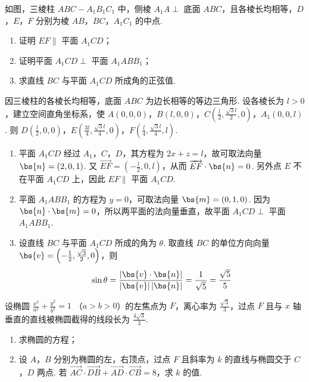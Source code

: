 \begin{problem}
如图，三棱柱 \(ABC - A_{1}B_{1}C_{1}\) 中，侧棱 \(A_{1}A \perp\) 底面 \(ABC\)，且各棱长均相等，\(D\)，\(E\)，\(F\) 分别为棱 \(AB\)，\(BC\)，\(A_{1}C_{1}\) 的中点.
\begin{enumerate}
\item 证明 \(EF \parallel\) 平面 \(A_{1}CD\)；
\item 证明平面 \(A_{1}CD \perp\) 平面 \(A_{1}ABB_{1}\)；
\item 求直线 \(BC\) 与平面 \(A_{1}CD\) 所成角的正弦值.
\end{enumerate}

\end{problem}

\begin{solution}
因三棱柱的各棱长均相等，底面 \(ABC\) 为边长相等的等边三角形. 设各棱长为 \(l>0\)，建立空间直角坐标系，使
\(A(0,0,0)\)，\(B(l,0,0)\)，\(C\left(\frac l2,\frac{\sqrt{3}l}{2},0\right)\)，\(A_1(0,0,l)\).
则
\(D\left(\frac l2,0,0\right)\)，\(E\left(\frac{3l}{4},\frac{\sqrt{3}l}{4},0\right)\)，\(F\left(\frac l4,\frac{\sqrt{3}l}{4},l\right)\).

\begin{enumerate}
\item 平面 \(A_1CD\) 经过 \(A_1\)，\(C\)，\(D\)，其方程为 \(2x+z=l\)，故可取法向量 \(\bs{n}=(2,0,1)\). 又
\(\overrightarrow{EF}=\left(-\frac l2,0,l\right)\)，从而 \(\overrightarrow{EF}\cdot\bs{n}=0\). 另外点 \(E\) 不在平面 \(A_1CD\) 上，因此 \(EF\parallel\) 平面 \(A_1CD\).

\item 平面 \(A_1ABB_1\) 的方程为 \(y=0\)，可取法向量 \(\bs{m}=(0,1,0)\). 因为 \(\bs{n}\cdot\bs{m}=0\)，所以两平面的法向量垂直，故平面 \(A_1CD\perp\) 平面 \(A_1ABB_1\).

\item 设直线 \(BC\) 与平面 \(A_1CD\) 所成的角为 \(\theta\). 取直线 \(BC\) 的单位方向向量
\(\bs{v}=\left(-\frac12,\frac{\sqrt{3}}{2},0\right)\)，则
\[
\sin\theta=\frac{|\bs{v}\cdot\bs{n}|}{|\bs{v}|\,|\bs{n}|}
=\frac{1}{\sqrt{5}}=\frac{\sqrt{5}}{5}
\]
\end{enumerate}
\end{solution}

\begin{problem}
设椭圆 \(\frac{x^2}{a^2} + \frac{y^2}{b^2} = 1 \) （\(a > b > 0\)）的左焦点为 \(F\)，离心率为 \(\frac{\sqrt{3}}{3}\)，过点 \(F\) 且与 \(x\) 轴垂直的直线被椭圆截得的线段长为 \(\frac{4\sqrt{3}}{3}\).
\begin{enumerate}
\item 求椭圆的方程；
\item 设 \(A\)，\(B\) 分别为椭圆的左，右顶点，过点 \(F\) 且斜率为 \(k\) 的直线与椭圆交于 \(C\)，\(D\) 两点. 若 \(\overrightarrow{AC} \cdot \overrightarrow{DB} + \overrightarrow{AD} \cdot \overrightarrow{CB} = 8\)，求 \(k\) 的值.
\end{enumerate}
\end{problem}

